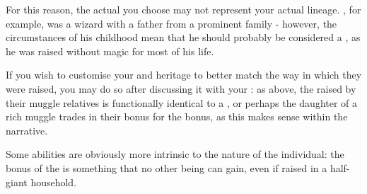 For this reason, the actual  you choose may not represent your actual lineage. , for example, was a  wizard with a father from a prominent  family - however, the circumstances of his childhood mean that he should probably be considered a , as he was raised without magic for most of his life.  
 
 If you wish to customise your  and heritage to better match the way in which they were raised, you may do so after discussing it with your : as above, the  raised by their muggle relatives is functionally identical to a , or perhaps the  daughter of a rich muggle trades in their  bonus for the  bonus, as this makes sense within the narrative. 
 
 Some abilities are obviously more intrinsic to the nature of the individual: the  bonus of the  is something that no other being can gain, even if raised in a half-giant household. 
